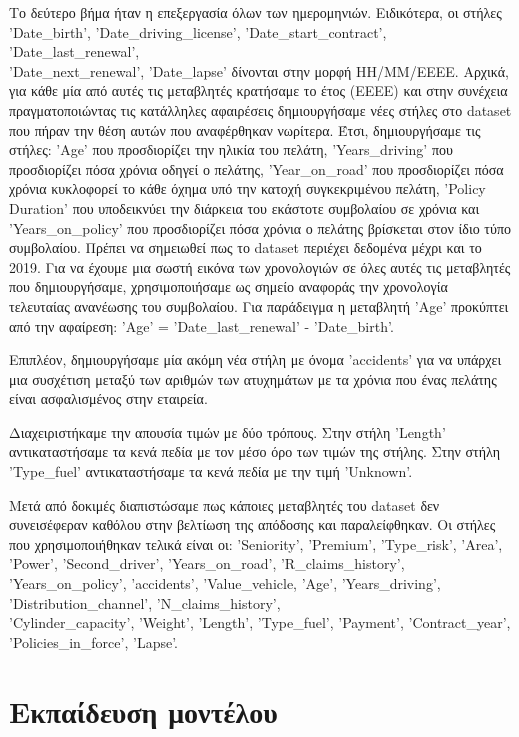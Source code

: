 \documentclass{llncs}
\begin{document}
Το δεύτερο βήμα ήταν η επεξεργασία όλων των ημερομηνιών. Ειδικότερα, οι στήλες 'Date\_birth', 'Date\_driving\_license', 'Date\_start\_contract', 'Date\_last\_renewal', \\
'Date\_next\_renewal', 'Date\_lapse' δίνονται στην μορφή ΗΗ/ΜΜ/ΕΕΕΕ. Αρχικά, για κάθε μία από αυτές τις μεταβλητές κρατήσαμε το έτος (ΕΕΕΕ) και στην συνέχεια πραγματοποιώντας τις κατάλληλες αφαιρέσεις
δημιουργήσαμε νέες στήλες στο dataset που πήραν την θέση αυτών που αναφέρθηκαν νωρίτερα. Έτσι, δημιουργήσαμε τις στήλες: 'Age' που προσδιορίζει την ηλικία του πελάτη, 'Years\_driving' που προσδιορίζει 
πόσα χρόνια οδηγεί ο πελάτης, 'Year\_on\_road' που προσδιορίζει πόσα χρόνια κυκλοφορεί το κάθε όχημα υπό την κατοχή συγκεκριμένου πελάτη, 'Policy Duration' που υποδεικνύει την διάρκεια του εκάστοτε συμβολαίου σε χρόνια και 
'Years\_on\_policy' που προσδιορίζει πόσα χρόνια ο πελάτης βρίσκεται στον ίδιο τύπο συμβολαίου. Πρέπει να σημειωθεί πως το dataset περιέχει δεδομένα μέχρι και το 2019. Για να έχουμε μια σωστή εικόνα των χρονολογιών
σε όλες αυτές τις μεταβλητές που δημιουργήσαμε, χρησιμοποιήσαμε ως σημείο αναφοράς την χρονολογία τελευταίας ανανέωσης του συμβολαίου. Για παράδειγμα η μεταβλητή 'Age' προκύπτει από την αφαίρεση:
'Age' = 'Date\_last\_renewal' - 'Date\_birth'.

Επιπλέον, δημιουργήσαμε μία ακόμη νέα στήλη με όνομα 'accidents' για να υπάρχει μια συσχέτιση μεταξύ των αριθμών των ατυχημάτων με τα χρόνια που ένας πελάτης είναι ασφαλισμένος στην εταιρεία.

Διαχειριστήκαμε την απουσία τιμών με δύο τρόπους. Στην στήλη 'Length' αντικαταστήσαμε τα κενά πεδία με τον μέσο όρο των τιμών της στήλης. Στην στήλη 'Type\_fuel' αντικαταστήσαμε τα κενά πεδία με την τιμή 
'Unknown'.

Μετά από δοκιμές διαπιστώσαμε πως κάποιες μεταβλητές του dataset δεν συνεισέφεραν καθόλου στην βελτίωση της απόδοσης και παραλείφθηκαν. Οι στήλες που χρησιμοποιήθηκαν τελικά είναι οι: 
'Seniority', 'Premium', 'Type\_risk', 'Area', 'Power', 'Second\_driver', 'Years\_on\_road', 'R\_claims\_history', 'Years\_on\_policy', 'accidents', 'Value\_vehicle, 'Age', 'Years\_driving', 'Distribution\_channel', 'N\_claims\_history',
\\ 'Cylinder\_capacity', 'Weight', 'Length', 'Type\_fuel', 'Payment', 'Contract\_year', \\'Policies\_in\_force', 'Lapse'.



\section{Εκπαίδευση μοντέλου}
\end{document}

